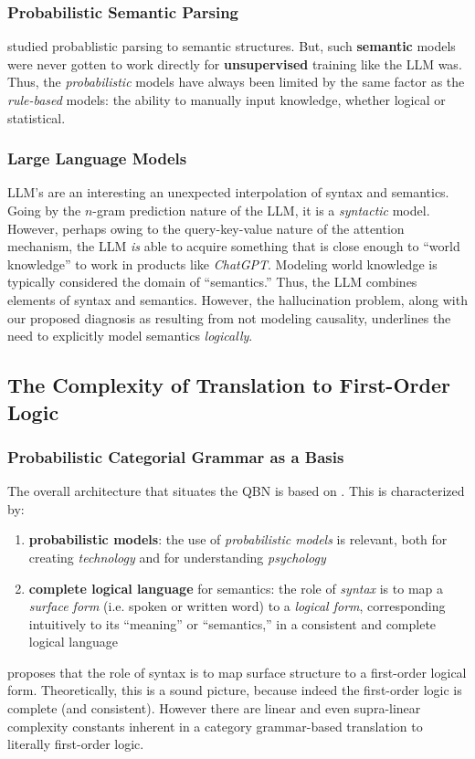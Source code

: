 \documentclass[12pt]{article}
\begin{document}
\subsubsection{Probabilistic Semantic Parsing}
\cite{macartney2007natural,steedman2000,lewis2013combined,kwiatkowski2010,Zettlemoyer2012} studied probablistic parsing to semantic structures.
But, such {\bf semantic} models were never gotten to work directly for {\bf unsupervised} training like the LLM was.
Thus, the {\em probabilistic} models have always been limited by the same factor as the {\em rule-based} models: the ability to manually input knowledge, whether logical or statistical.
\subsubsection{Large Language Models}
LLM's are an interesting an unexpected interpolation of syntax and semantics.
Going by the $n$-gram prediction nature of the LLM, it is a {\em syntactic} model.
However, perhaps owing to the query-key-value nature of the attention mechanism, the LLM {\em is} able to acquire something that is close enough to ``world knowledge'' to work in products like {\em ChatGPT}.
Modeling world knowledge is typically considered the domain of ``semantics.''
Thus, the LLM combines elements of syntax and semantics.
However, the hallucination problem, along with our proposed diagnosis as resulting from not modeling causality, underlines the need to explicitly model semantics {\em logically}.

\subsection{The Complexity of Translation to First-Order Logic}
\subsubsection{Probabilistic Categorial Grammar as a Basis}
The overall architecture that situates the QBN is based on \cite{BarHillel1953, steedman2000,lewis2013combined,kwiatkowski2010,Zettlemoyer2012}.
This is characterized by:
\begin{enumerate}
    \item {\bf probabilistic models}: the use of {\em probabilistic models} is relevant, both for creating {\em technology} and for understanding {\em psychology}
    \item {\bf complete logical language} for semantics: the role of {\em syntax} is to map a {\em surface form} (i.e. spoken or written word) to a {\em logical form}, corresponding intuitively to its ``meaning'' or ``semantics,'' in a consistent and complete logical language
\end{enumerate}
\cite{Steedman1996,steedman2000} proposes that the role of syntax is to map surface structure to a first-order logical form.
Theoretically, this is a sound picture, because indeed the first-order logic is complete (and consistent).
However there are linear and even supra-linear complexity constants inherent in a category grammar-based translation to literally first-order logic.
\end{document}
